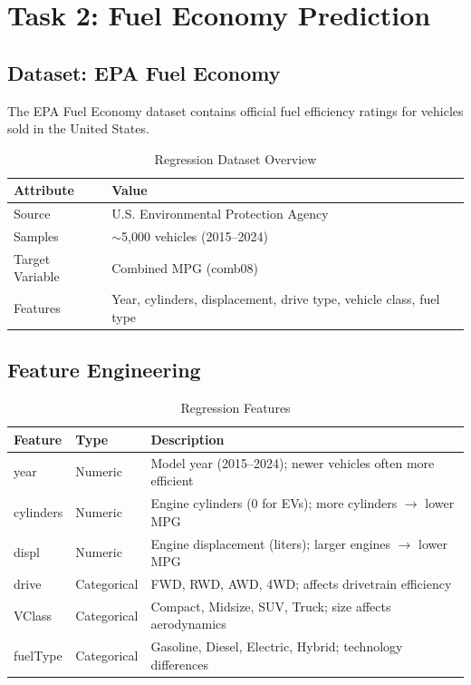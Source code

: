 \documentclass[11pt,a4paper]{article}
\begin{document}
\section{Task 2: Fuel Economy Prediction}

\subsection{Dataset: EPA Fuel Economy}

The EPA Fuel Economy dataset contains official fuel efficiency ratings for vehicles sold in the United States.

\begin{table}[H]
\centering
\caption{Regression Dataset Overview}
\begin{tabular}{ll}
\toprule
\textbf{Attribute} & \textbf{Value} \\
\midrule
Source & U.S. Environmental Protection Agency \\
Samples & $\sim$5,000 vehicles (2015--2024) \\
Target Variable & Combined MPG (comb08) \\
Features & Year, cylinders, displacement, drive type, vehicle class, fuel type \\
\bottomrule
\end{tabular}
\end{table}

\subsection{Feature Engineering}

\begin{table}[H]
\centering
\caption{Regression Features}
\begin{tabular}{p{3cm}p{2.5cm}p{7cm}}
\toprule
\textbf{Feature} & \textbf{Type} & \textbf{Description} \\
\midrule
year & Numeric & Model year (2015--2024); newer vehicles often more efficient \\
cylinders & Numeric & Engine cylinders (0 for EVs); more cylinders $\rightarrow$ lower MPG \\
displ & Numeric & Engine displacement (liters); larger engines $\rightarrow$ lower MPG \\
drive & Categorical & FWD, RWD, AWD, 4WD; affects drivetrain efficiency \\
VClass & Categorical & Compact, Midsize, SUV, Truck; size affects aerodynamics \\
fuelType & Categorical & Gasoline, Diesel, Electric, Hybrid; technology differences \\
\bottomrule
\end{tabular}
\end{table}
\end{document}
